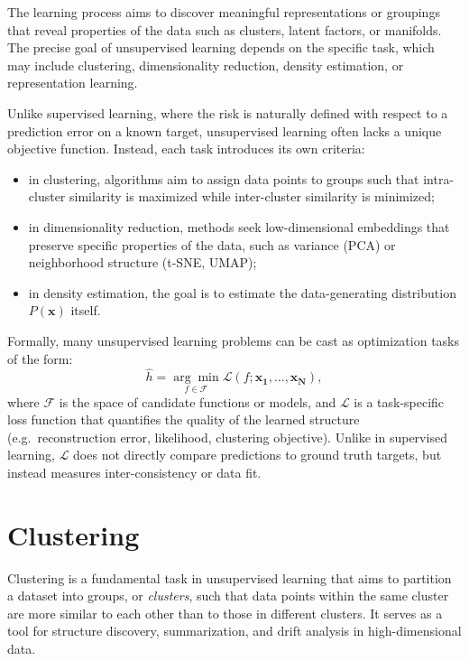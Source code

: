 The learning process aims to discover meaningful representations or groupings
that reveal properties of the data such as clusters, latent factors, or
manifolds. The precise goal of unsupervised learning depends on the specific
task, which may include clustering, dimensionality reduction, density
estimation, or representation learning.

Unlike supervised learning, where the risk is naturally defined with respect to
a prediction error on a known target, unsupervised learning often lacks a
unique objective function. Instead, each task introduces its own criteria:
\begin{itemize}
    \item in clustering, algorithms aim to assign data points to groups such that
          intra-cluster similarity is maximized while inter-cluster similarity is
          minimized;
    \item in dimensionality reduction, methods seek low-dimensional embeddings that
          preserve specific properties of the data, such as variance (PCA) or
          neighborhood structure (t-SNE, UMAP);
    \item in density estimation, the goal is to estimate the data-generating distribution
          $P(\mathbf{x})$ itself.
\end{itemize}
Formally, many unsupervised learning problems can be cast as optimization tasks of the form:
\[
    \hat{h} = \underset{f \in \mathcal{F}}{\arg\min} \mathcal{L}(f; \mathbf{x_1,\ldots,x_N}),
\]
where $\mathcal{F}$ is the space of candidate functions or models, and
$\mathcal{L}$ is a task-specific loss function that quantifies the quality of
the learned structure (e.g.\ reconstruction error, likelihood, clustering
objective). Unlike in supervised learning, $\mathcal{L}$ does not directly
compare predictions to ground truth targets, but instead measures
inter-consistency or data fit.

\section{Clustering}\label{sec:clustering}
Clustering is a fundamental task in unsupervised learning that aims to
partition a dataset into groups, or \textit{clusters}, such that data points
within the same cluster are more similar to each other than to those in
different clusters. It serves as a tool for structure discovery, summarization,
and drift analysis in high-dimensional data.

